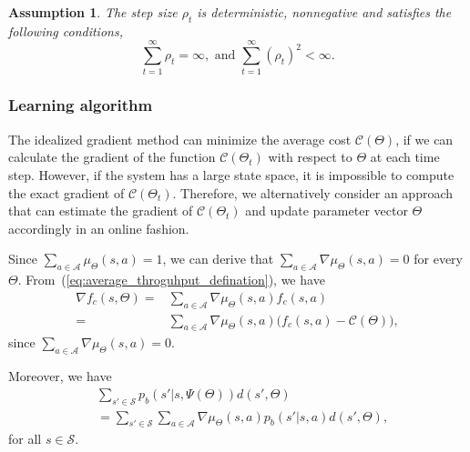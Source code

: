 \documentclass[twocolumn,10pt]{IEEEtran}
\newtheorem{assumption} {Assumption}
\begin{document}
\begin{assumption}
	\label{ass:step size}
	The step size $\rho_{t}$ is deterministic, nonnegative and satisfies the following conditions,
	\begin{equation}
	\sum_{t=1}^{\infty}\rho_{t} = \infty, \mbox{ and } \sum_{t=1}^{\infty} ( \rho_{t} )^{2} < \infty	.
	\end{equation}
\end{assumption}


\subsubsection{Learning algorithm}

The idealized gradient method can minimize the average cost $\mathcal{C} (\Theta)$, if we can calculate the gradient of the function $\mathcal{C} (\Theta_{t})$ with respect to $\Theta$ at each time step. However, if the system has a large state space, it is impossible to compute the exact gradient of $\mathcal{C} (\Theta_{t})$. Therefore, we alternatively consider an approach that can estimate the gradient of $\mathcal{C} (\Theta_{t})$ and update parameter vector $\Theta$ accordingly in an online fashion. 

Since $\sum_{a\in \mathcal{A}} \mu_{\Theta} (s,a) =1$, we can derive that $\sum_{a\in \mathcal{A}} \nabla \mu_{\Theta} (s,a) = 0$ for every $\Theta$. From~(\ref{eq:average_throguhput_defination}), we have 
\begin{equation}
\begin{aligned}
\nabla f_c (s, \Theta)  = & \sum_{a \in \mathcal{A}} \nabla \mu_{\Theta}(s,a) f_c (s, a)	\\
= &	\sum_{a \in \mathcal{A}} \nabla \mu_{\Theta}(s,a) \big( f_c (s, a)  - \mathcal{C} (\Theta)  \big) 	,
\end{aligned}
\end{equation}
since $\sum_{a\in \mathcal{A}} \nabla \mu_{\Theta} (s,a) = 0$.

Moreover, we have 
\begin{equation}
\begin{aligned}
&\sum_{s' \in \mathcal{S}} p_b (s'|s,\Psi(\Theta)) d(s', \Theta) \\ 
& = \sum_{s' \in \mathcal{S}} \sum_{a \in \mathcal{A}} \nabla \mu_{\Theta} (s,a) p_b (s'|s,a)  d(s',\Theta)	,
\end{aligned}
\end{equation}
for all $s \in \mathcal{S}$.
\end{document}
